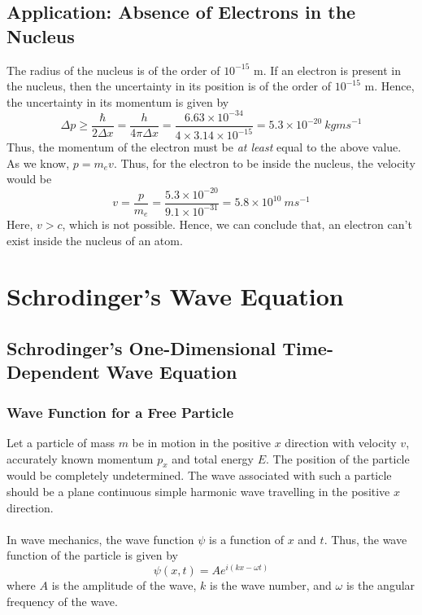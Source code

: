 \documentclass[12pt]{article}
\numberwithin{equation}{subsection}
\begin{document}
\subsection{Application: Absence of Electrons in the Nucleus}
The radius of the nucleus is of the order of $10^{-15}$ m. If an electron is present in the nucleus, then the uncertainty in its position is of the order of $10^{-15}$ m. Hence, the uncertainty in its momentum is given by \[
    \Delta p \geq \frac{\hbar}{2\Delta x} = \frac{h}{4\pi\Delta x} = \frac{6.63 \times 10^{-34}}{4 \times 3.14 \times 10^{-15}} = 5.3 \times 10^{-20} \: \si{kg m s}^{-1}
\]
Thus, the momentum of the electron must be \textit{at least} equal to the above value. As we know, $p = m_e v$. Thus, for the electron to be inside the nucleus, the velocity would be \[
    v = \frac{p}{m_e} = \frac{5.3 \times 10^{-20}}{9.1 \times 10^{-31}} = 5.8 \times 10^{10} \: \si{m s}^{-1}
\]
Here, $v > c$, which is not possible. Hence, we can conclude that, an electron can't exist inside the nucleus of an atom.




\section{Schrodinger's Wave Equation}
\subsection{Schrodinger's One-Dimensional Time-Dependent Wave Equation}
\subsubsection{Wave Function for a Free Particle}
Let a particle of mass $m$ be in motion in the positive $x$ direction with velocity $v$, accurately known momentum $p_x$ and total energy $E$. The position of the particle would be completely undetermined. The wave associated with such a particle should be a plane continuous simple harmonic wave travelling in the positive $x$ direction.\\~\\
In wave mechanics, the wave function $\psi$ is a function of $x$ and $t$. Thus, the wave function of the particle is given by
\begin{equation}
    \boxed{ \psi(x, t) = A e^{i(kx - \omega t)} }
\end{equation}
where $A$ is the amplitude of the wave, $k$ is the wave number, and $\omega$ is the angular frequency of the wave. \\~\\
\end{document}
